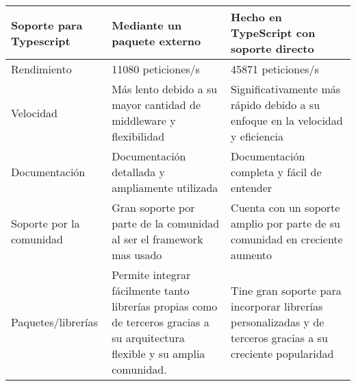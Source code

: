 \begin{longtable}{|p{5cm}|p{5cm}|p{5cm}|}
    \hline \hline
    \endlastfoot
    Soporte para Typescript                        & Mediante un paquete externo                                                                                                    & Hecho en TypeScript con soporte directo                                                                     \\\hline
    Rendimiento                                    & 11080 peticiones/s                                                                                                             & 45871 peticiones/s                                                                                          \\\hline
    Velocidad                                      & Más lento debido a su mayor cantidad de middleware y flexibilidad                                                              & Significativamente más rápido debido a su enfoque en la velocidad y eficiencia                              \\\hline
    Documentación                                  & Documentación detallada y ampliamente utilizada                                                                                & Documentación completa y fácil de entender                                                                  \\\hline
    Soporte por la comunidad                       & Gran soporte por parte de la comunidad al ser el framework mas usado                                                           & Cuenta con un soporte amplio por parte de su comunidad en creciente aumento                                 \\\hline
    Paquetes/librerías                             & Permite integrar fácilmente tanto librerías propias como de terceros gracias a su arquitectura flexible y su amplia comunidad. & Tine gran soporte para incorporar librerías personalizadas y de terceros gracias a su creciente popularidad \\
\end{longtable}